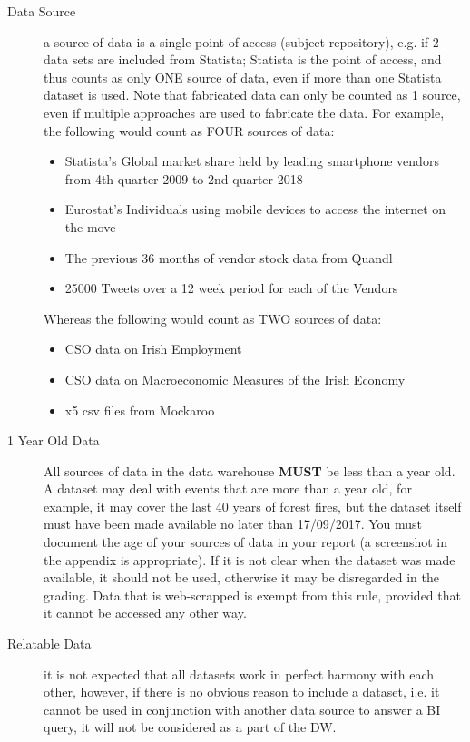 \documentclass{article}[a4paper,12pt]
\begin{document}
\begin{description}
\item[Data Source] a source of data is a single point of access (subject repository), e.g. if 2 data sets are included from Statista; Statista is the point of access, and thus counts as only ONE source of data, even if more than one Statista dataset is used. Note that fabricated data can only be counted as 1 source, even if multiple approaches are used to fabricate the data. For example, the following would count as FOUR sources of data:
\begin{itemize}
\item Statista’s Global market share held by leading smartphone vendors from 4th quarter 2009 to 2nd quarter 2018
\item Eurostat’s Individuals using mobile devices to access the internet on the move 
\item The previous 36 months of vendor stock data from Quandl
\item 25000 Tweets over a 12 week period for each of the Vendors
\end{itemize}

Whereas the following would count as TWO sources of data:
\begin{itemize}
\item CSO data on Irish Employment
\item CSO data on Macroeconomic Measures of the Irish Economy 
\item x5 csv files from Mockaroo
\end{itemize}

\item[1 Year Old Data] All sources of data in the data warehouse \textbf{MUST} be less than a year old. A dataset may deal with events that are more than a year old, for example, it may cover the last 40 years of forest fires, but the dataset itself must have been made available no later than 17/09/2017. You must document the age of your sources of data in your report (a screenshot in the appendix is appropriate). If it is not clear when the dataset was made available, it should not be used, otherwise it may be disregarded in the grading. Data that is web-scrapped is exempt from this rule, provided that it cannot be accessed any other way.

\item[Relatable Data] it is not expected that all datasets work in perfect harmony with each other, however, if there is no obvious reason to include a dataset, i.e. it cannot be used in conjunction with another data source to answer a BI query, it will not be considered as a part of the DW.


\end{description}
\end{document}
